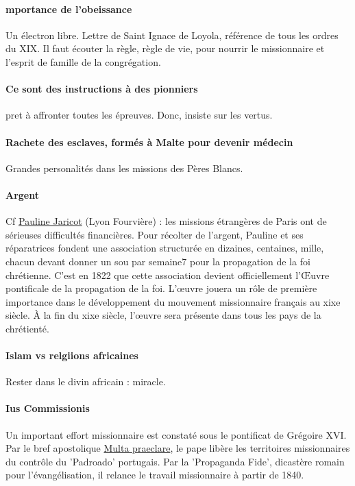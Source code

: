 \paragraph{mportance de l'obeissance} Un électron libre.  Lettre de Saint Ignace de Loyola, référence de tous les ordres du XIX. Il faut écouter la règle, règle de vie, pour nourrir le missionnaire et l'esprit de famille de la congrégation. 


\paragraph{Ce sont des instructions à des pionniers} pret à affronter toutes les épreuves. Donc, insiste sur les vertus.

\paragraph{Rachete des esclaves, formés à Malte pour devenir médecin} Grandes personalités dans les missions des Pères Blancs.

\paragraph{Argent} Cf \href{https://fr.wikipedia.org/wiki/Pauline_Jaricot}{Pauline Jaricot} (Lyon Fourvière) :  les missions étrangères de Paris ont de sérieuses difficultés financières. Pour récolter de l'argent, Pauline et ses réparatrices fondent une association structurée en dizaines, centaines, mille, chacun devant donner un sou par semaine7 pour la propagation de la foi chrétienne. C'est en 1822 que cette association devient officiellement l'Œuvre pontificale de la propagation de la foi.
L'œuvre jouera un rôle de première importance dans le développement du mouvement missionnaire français au xixe siècle.  À la fin du xixe siècle, l'œuvre sera présente dans tous les pays de la chrétienté.

\paragraph{Islam vs relgiions africaines} Rester dans le divin africain : miracle. 


\paragraph{Ius Commissionis} Un important effort missionnaire est constaté sous le pontificat de Grégoire XVI. Par le bref apostolique \href{https://fr.wikipedia.org/wiki/Multa_praeclare}{Multa praeclare}, le pape libère les territoires missionnaires du contrôle du 'Padroado' portugais. Par la 'Propaganda Fide', dicastère romain pour l'évangélisation, il relance le travail missionnaire à partir de 1840.

